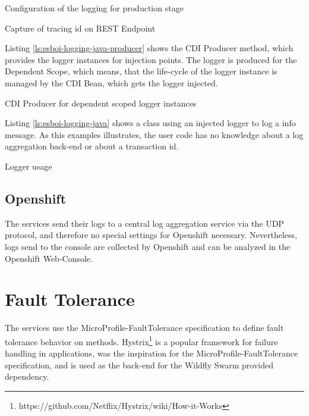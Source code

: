 \begin{listing}[h]
	\caption{Configuration of the logging for production stage}
	\label{ls:esboi-logging-prod-project-stages}
\end{listing}

\begin{listing}[h]
	\caption{Capture of tracing id on REST Endpoint}
	\label{ls:esboi-logging-java-transaction-id}
\end{listing} 

Listing \vref{ls:esboi-logging-java-producer} shows the CDI Producer method, which provides the logger instances for injection points. The logger is produced for the Dependent Scope, which means, that the life-cycle of the logger instance is managed by the CDI Bean, which gets the logger injected.
\newpage

\begin{listing}[h]
	\caption{CDI Producer for dependent scoped logger instances}
	\label{ls:esboi-logging-java-producer}
\end{listing} 

Listing \vref{ls:esboi-logging-java} shows a class using an injected logger to log a info message. As this examples illustrates, the user code has no knowledge about a log aggregation back-end or about a transaction id.

\begin{listing}[h]
	\caption{Logger usage}
	\label{ls:esboi-logging-java}
\end{listing} 

\subsection{Openshift}
\label{sec:esbi-logging-openshift}
The services send their logs to a central log aggregation service via the UDP protocol, and therefore no special settings for Openshift necessary. Nevertheless, logs send to the console are collected by Openshift and can be analyzed in the Openshift Web-Console.

\section{Fault Tolerance}
\label{sec:esbi-fault}
The services use the MicroProfile-FaultTolerance specification to define fault tolerance behavior on methods. Hystrix\footnote{https://github.com/Netflix/Hystrix/wiki/How-it-Works} is a popular framework for failure handling in applications, was the inspiration for the MicroProfile-FaultTolerance specification, and is used as the back-end for the Wildfly Swarm provided dependency.

